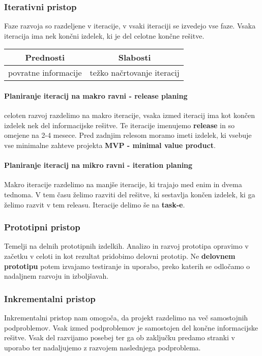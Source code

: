 \documentclass[a4paper,12pt]{report}
\begin{document}
   \subsubsection{Iterativni pristop}
   Faze razvoja so razdeljene v iteracije, v vsaki iteraciji se izvedejo vse faze. Vsaka iteracija ima nek končni izdelek, ki je del celotne končne rešitve.

   \begin{center}
      \begin{tabular}{|c||c|}
         \hline
         \textbf{Prednosti} & \textbf{Slabosti}\\
         \hline
         povratne informacije & težko načrtovanje iteracij\\
         \hline
      \end{tabular}
   \end{center}

   \paragraph{Planiranje iteracij na makro ravni - release planing} celoten razvoj razdelimo na makro iteracije, vsaka izmed iteracij ima kot končen izdelek nek del informacijske rešitve.
   Te iteracije imenujemo \textbf{release} in so omejene na 2-4 mesece. Pred zadnjim relesom moramo imeti izdelek, ki vsebuje vse minimalne zahteve projekta
   \textbf{MVP - minimal value product}.

   \paragraph{Planiranje iteracij na mikro ravni - iteration planing} Makro iteracije razdelimo na manjše iteracije, ki trajajo med enim in dvema tednoma.
   V tem času želimo razviti del rešitve, ki sestavlja končen izdelek, ki ga želimo razvit v tem releasu. Iteracije delimo še na \textbf{task-e}.

   \subsubsection{Prototipni pristop}
   Temelji na delnih prototipnih izdelkih. Analizo in razvoj prototipa opravimo v začetku v celoti in kot rezultat pridobimo delovni prototip.
   Ne \textbf{delovnem prototipu} potem izvajamo testiranje in uporabo, preko katerih se odločamo o nadaljnem razvoju in izboljšavah.

   \subsubsection{Inkrementalni pristop}
   Inkrementalni pristop nam omogoča, da projekt razdelimo na več samostojnih podproblemov. Vsak izmed podproblemov je samostojen del končne informacijske rešitve.
   Vsak del razvijamo posebej ter ga ob zaključku predamo stranki v uporabo ter nadaljujemo z razvojem naslednjega podproblema.
\end{document}
